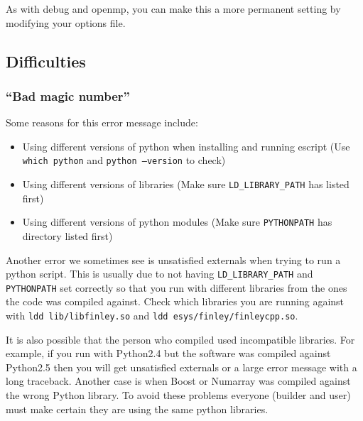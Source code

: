 As with debug and openmp, you can make this a more permanent setting by modifying your options file.

\subsection{Difficulties}

\subsubsection{``Bad magic number''}
Some reasons for this error message include:
\begin{itemize}
 \item Using different versions of python when installing and running escript (Use \texttt{which python} and \texttt{python --version} to check)
\item Using different versions of libraries (Make sure \texttt{LD_LIBRARY_PATH} has  listed first)
\item Using different versions of python modules (Make sure \texttt{PYTHONPATH} has  directory listed first) 
\end{itemize}

Another error we sometimes see is unsatisfied externals when trying to run a python script. This is usually due to not having \texttt{LD_LIBRARY_PATH} and \texttt{PYTHONPATH} set correctly so that you run with different libraries from the ones the code was compiled against. Check which libraries you are running against with \texttt{ldd lib/libfinley.so} and \texttt{ldd esys/finley/finleycpp.so}.

It is also possible that the person who compiled \esfinley used incompatible libraries. For example, if you run with Python2.4 but the software was compiled against Python2.5 then you will get unsatisfied externals or a large error message with a long traceback. Another case is when Boost or Numarray was compiled against the wrong Python library. To avoid these problems everyone (builder and user) must make certain they are using the same python libraries. 

